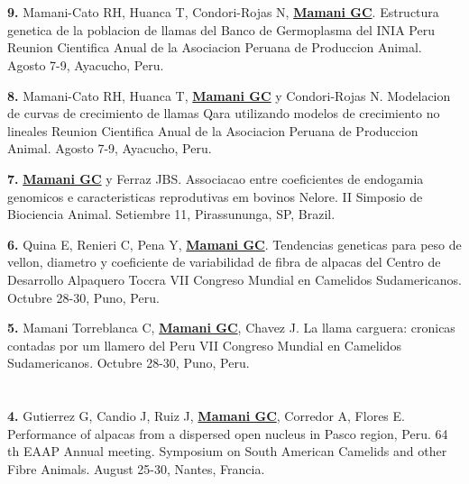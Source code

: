 \documentclass[margin,line,10pt]{res}
\newenvironment{list1}{
  \begin{list}{\ding{113}}{%
      \setlength{\itemsep}{0in}
      \setlength{\parsep}{0in} \setlength{\parskip}{0in}
      \setlength{\topsep}{0in} \setlength{\partopsep}{0in} 
      \setlength{\leftmargin}{0.17in}}}{\end{list}}
\begin{document}
\begin{resume}
\section{}
\begin{list1}
\item [\bf{9}.] Mamani-Cato RH, Huanca T, Condori-Rojas N, {\bf \underline{Mamani GC}}.
Estructura genetica de la poblacion de llamas del Banco de Germoplasma del INIA Peru
Reunion Cientifica Anual de la Asociacion Peruana de Produccion Animal. Agosto 7-9, Ayacucho, Peru. 
\vspace{0.5cm}

\item [\bf{8}.] Mamani-Cato RH, Huanca T, {\bf \underline{Mamani GC}} y Condori-Rojas N.
Modelacion de curvas de crecimiento de llamas Qara utilizando modelos de crecimiento no lineales
Reunion Cientifica Anual de la Asociacion Peruana de Produccion Animal. Agosto 7-9, Ayacucho, Peru. 
\vspace{0.5cm}

\item [\bf{7}.] {\bf \underline{Mamani GC}} y Ferraz JBS. 
Associacao entre coeficientes de endogamia genomicos e caracteristicas reprodutivas em bovinos Nelore.
II Simposio de Biociencia Animal. Setiembre 11, Pirassununga, SP, Brazil. 
\vspace{0.5cm}

\item [\bf{6}.] Quina E, Renieri C, Pena Y, {\bf \underline{Mamani GC}}.
Tendencias geneticas para peso de vellon, diametro y coeficiente de variabilidad de fibra de alpacas del Centro de Desarrollo Alpaquero Toccra
VII Congreso Mundial en Camelidos Sudamericanos. Octubre 28-30, Puno, Peru. 
\vspace{0.5cm}

\item [\bf{5}.] Mamani Torreblanca C, {\bf \underline{Mamani GC}}, Chavez J.
La llama carguera: cronicas contadas por um llamero del Peru
VII Congreso Mundial en Camelidos Sudamericanos. Octubre 28-30, Puno, Peru. 
\end{list1}
\vspace{0.5cm}

\section{}
\begin{list1}
\item [\bf{4}.] Gutierrez G, Candio J, Ruiz J, {\bf \underline{Mamani GC}}, Corredor A, Flores E.
Performance of alpacas from a dispersed open nucleus in Pasco region, Peru.
64 th EAAP Annual meeting. Symposium on South American Camelids and other Fibre Animals. August 25-30, Nantes, Francia. 
\vspace{0.5cm}


\end{list1}
\end{resume}
\end{document}
